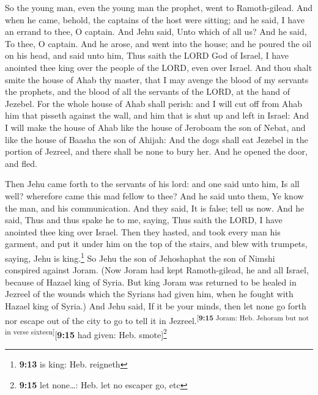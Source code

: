  So the young man, even the young man the prophet, went to
Ramoth-gilead.  And when he came, behold, the captains of
the host were sitting; and he said, I have an errand to thee, O captain.
And Jehu said, Unto which of all us? And he said, To thee, O captain.
 And he arose, and went into the house; and he poured the
oil on his head, and said unto him, Thus saith the LORD God of Israel, I
have anointed thee king over the people of the LORD, even over Israel.
 And thou shalt smite the house of Ahab thy master, that I
may avenge the blood of my servants the prophets, and the blood of all
the servants of the LORD, at the hand of Jezebel.  For the
whole house of Ahab shall perish: and I will cut off from Ahab him that
pisseth against the wall, and him that is shut up and left in Israel:
 And I will make the house of Ahab like the house of
Jeroboam the son of Nebat, and like the house of Baasha the son of
Ahijah:  And the dogs shall eat Jezebel in the portion of
Jezreel, and there shall be none to bury her. And he opened the door,
and fled.

 Then Jehu came forth to the servants of his lord: and
one said unto him, Is all well? wherefore came this mad fellow to thee?
And he said unto them, Ye know the man, and his communication.
 And they said, It is false; tell us now. And he said,
Thus and thus spake he to me, saying, Thus saith the LORD, I have
anointed thee king over Israel.  Then they hasted, and
took every man his garment, and put it under him on the top of the
stairs, and blew with trumpets, saying, Jehu is king.\footnote{\textbf{9:13}
  is king: Heb. reigneth}  So Jehu the son of Jehoshaphat
the son of Nimshi conspired against Joram. (Now Joram had kept
Ramoth-gilead, he and all Israel, because of Hazael king of Syria.
 But king Joram was returned to be healed in Jezreel of
the wounds which the Syrians had given him, when he fought with Hazael
king of Syria.) And Jehu said, If it be your minds, then let none go
forth nor escape out of the city to go to tell it in
Jezreel.\textsuperscript{{[}\textbf{9:15} Joram: Heb. Jehoram but not in
verse sixteen{]}}{[}\textbf{9:15} had given: Heb. smote{]}\footnote{\textbf{9:15}
  let none\ldots: Heb. let no escaper go, etc}

